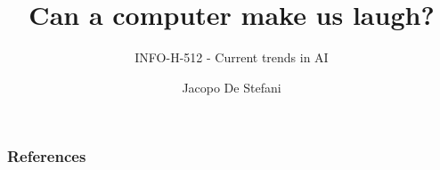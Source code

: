 \documentclass{beamer}
\author{Jacopo De Stefani}
\title{Can a computer make us laugh?}
\subtitle{INFO-H-512 - Current trends in AI}
\institute{Universite' Libre de Bruxelles}
\begin{document}
\begin{frame}[t,plain]
\titlepage
\end{frame}



\begin{frame}[allowframebreaks]
         \frametitle{References}
         
         
\end{frame}
\end{document}
